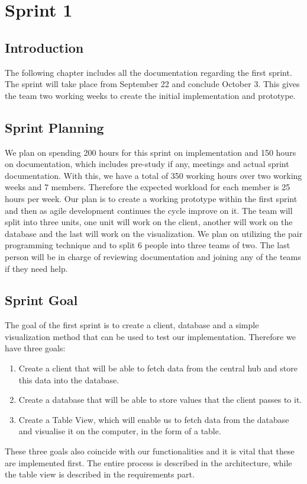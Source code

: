 \documentclass[../document.tex]{subfiles}
\begin{document}
\section{Sprint 1}

\subsection{Introduction}
The following chapter includes all the documentation regarding the first sprint. The sprint will take place from September 22 and conclude October 3. This gives the team two working weeks to create the initial implementation and prototype.

\subsection{Sprint Planning}
We plan on spending 200 hours for this sprint on implementation and 150 hours on documentation, which includes pre-study if any, meetings and actual sprint documentation. With this, we have a total of 350 working hours over two working weeks and 7 members. Therefore the expected workload for each member is 25 hours per week. Our plan is to create a working prototype within the first sprint and then as agile development continues the cycle improve on it. The team will split into three units, one unit will work on the client, another will work on the database and the last will work on the visualization. We plan on utilizing the pair programming technique and to split 6 people into three teams of two. The last person will be in charge of reviewing documentation and joining any of the teams if they need help.

\subsection{Sprint Goal}
The goal of the first sprint is to create a client, database and a simple visualization method that can be used to test our implementation. Therefore we have three goals:
\begin{enumerate}
\item
Create a client that will be able to fetch data from the central hub and store this data into the database.
\item
Create a database that will be able to store values that the client passes to it.
\item
Create a Table View, which will enable us to fetch data from the database and visualise it on the computer, in the form of a table.
\end{enumerate}
These three goals also coincide with our functionalities and it is vital that these are implemented first. The entire process is described in the architecture, while the table view is described in the requirements part.
\end{document}
